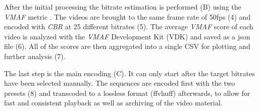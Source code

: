 After the initial processing the bitrate estimation is performed (B) using the \textit{VMAF} metric \cite{lin2013:mmf}. The videos are brought to the same frame rate of 50fps (4) and encoded with \textit{CBR} at 25 different bitrates (5). The average \textit{VMAF} score of each video is analyzed with the \textit{VMAF} Development Kit (VDK) \cite{web:vdk} and saved as a json file (6). All of the scores are then aggregated into a single CSV for plotting and further analysis (7).

The last step is the main encoding (C). It can only start after the target bitrates have been selected manually. The sequences are encoded first with the two presets (8) and transcoded to a lossless format (ffvhuff) afterwards, to allow for fast and consistent playback as well as archiving of the video material.


